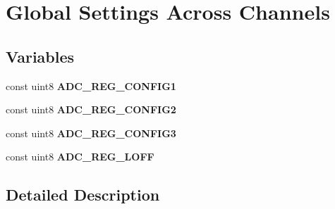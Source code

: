 \hypertarget{group___gbl_set}{\section{Global Settings Across Channels}
\label{group___gbl_set}
}
\subsection*{Variables}
\begin{DoxyCompactItemize}
\item 
\hypertarget{group___gbl_set_gac3e4807db82c5a50b930fa0abcf00b67}{const uint8 {\bfseries A\-D\-C\-\_\-\-R\-E\-G\-\_\-\-C\-O\-N\-F\-I\-G1}}\label{group___gbl_set_gac3e4807db82c5a50b930fa0abcf00b67}

\item 
\hypertarget{group___gbl_set_ga011ddf863a41484cf0432972aebeb4f3}{const uint8 {\bfseries A\-D\-C\-\_\-\-R\-E\-G\-\_\-\-C\-O\-N\-F\-I\-G2}}\label{group___gbl_set_ga011ddf863a41484cf0432972aebeb4f3}

\item 
\hypertarget{group___gbl_set_ga145b2d3aacafd352d63481d8ce3e3504}{const uint8 {\bfseries A\-D\-C\-\_\-\-R\-E\-G\-\_\-\-C\-O\-N\-F\-I\-G3}}\label{group___gbl_set_ga145b2d3aacafd352d63481d8ce3e3504}

\item 
\hypertarget{group___gbl_set_ga3f85dccd235fe12483e82bb33a074f69}{const uint8 {\bfseries A\-D\-C\-\_\-\-R\-E\-G\-\_\-\-L\-O\-F\-F}}\label{group___gbl_set_ga3f85dccd235fe12483e82bb33a074f69}

\end{DoxyCompactItemize}


\subsection{Detailed Description}
